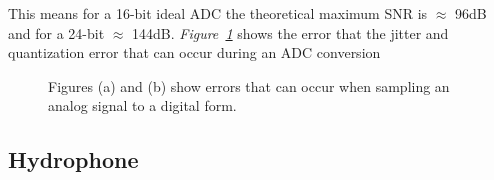 This means for a 16-bit ideal ADC the theoretical maximum SNR is $\approx$ 96dB and for a 24-bit $\approx$ 144dB.
\textit{Figure~\ref{fig:jitterQuatnError}} shows the error that the jitter and quantization error that can occur during an ADC conversion

\begin{figure}[h]
    \centering
    \hfill
    \caption{Figures (a) and (b) show errors that can occur when sampling an analog signal to a digital form.}
    \label{fig:jitterQuatnError}
\end{figure}




\subsection{Hydrophone}

